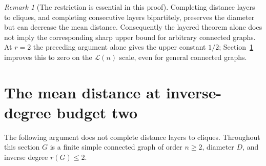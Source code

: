 \documentclass[11pt]{amsart}
\theoremstyle{definition}
\theoremstyle{remark}
\newtheorem{remark}[theorem]{Remark}
\newcommand{\Lz}{\mathcal{L}}
\begin{document}
\begin{remark}[The restriction is essential in this proof]
Completing distance layers to cliques, and completing consecutive layers
bipartitely, preserves the diameter but can decrease the mean distance.
Consequently the layered theorem alone does not imply the corresponding
sharp upper bound for arbitrary connected graphs. At $r=2$ the preceding argument alone gives the upper constant $1/2$;
Section~\ref{sec:meantwo} improves this to zero on the $\Lz(n)$ scale,
even for general connected graphs.
\end{remark}
\section{The mean distance at inverse-degree budget two}\label{sec:meantwo}

The following argument does not complete distance layers to cliques.
Throughout this section $G$ is a finite simple connected graph of order
$n\ge2$, diameter $D$, and inverse degree $r(G)\le2$.
\end{document}
